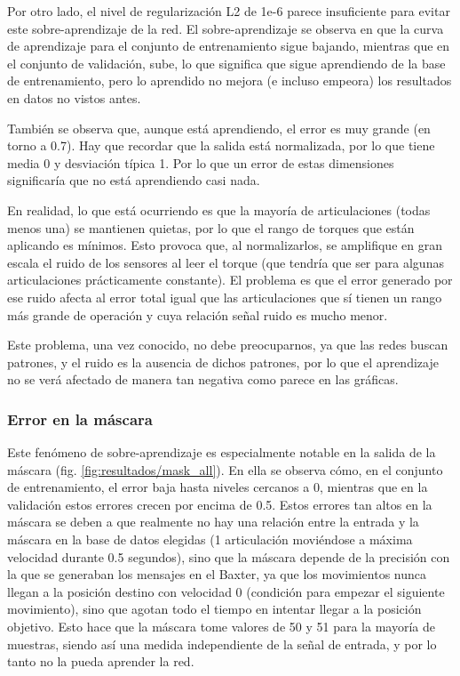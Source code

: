 Por otro lado, el nivel de regularización L2 de 1e-6 parece insuficiente para evitar este sobre-aprendizaje de la red. El sobre-aprendizaje se observa en que la curva de aprendizaje para el conjunto de entrenamiento sigue bajando, mientras que en el conjunto de validación, sube, lo que significa que sigue aprendiendo de la base de entrenamiento, pero lo aprendido no mejora (e incluso empeora) los resultados en datos no vistos antes.

También se observa que, aunque está aprendiendo, el error es muy grande (en torno a 0.7). Hay que recordar que la salida está normalizada, por lo que tiene media 0 y desviación típica 1. Por lo que un error de estas dimensiones significaría que no está aprendiendo casi nada.

En realidad, lo que está ocurriendo es que la mayoría de articulaciones (todas menos una) se mantienen quietas, por lo que el rango de torques que están aplicando es mínimos. Esto provoca que, al normalizarlos, se amplifique en gran escala el ruido de los sensores al leer el torque (que tendría que ser para algunas articulaciones prácticamente constante). El problema es que el error generado por ese ruido afecta al error total igual que las articulaciones que sí tienen un rango más grande de operación y cuya relación señal ruido es mucho menor.

Este problema, una vez conocido, no debe preocuparnos, ya que las redes buscan patrones, y el ruido es la ausencia de dichos patrones, por lo que el aprendizaje no se verá afectado de manera tan negativa como parece en las gráficas.

\subsubsection{Error en la máscara}

Este fenómeno de sobre-aprendizaje es especialmente notable en la salida de la máscara (fig. \ref{fig:resultados/mask_all}). En ella se observa cómo, en el conjunto de entrenamiento, el error baja hasta niveles cercanos a 0, mientras que en la validación estos errores crecen por encima de 0.5. Estos errores tan altos en la máscara se deben a que realmente no hay una relación entre la entrada y la máscara en la base de datos elegidas (1 articulación moviéndose a máxima velocidad durante 0.5 segundos), sino que la máscara depende de la precisión con la que se generaban los mensajes en el Baxter, ya que los movimientos nunca llegan a la posición destino con velocidad 0 (condición para empezar el siguiente movimiento), sino que agotan todo el tiempo en intentar llegar a la posición objetivo. Esto hace que la máscara tome valores de 50 y 51 para la mayoría de muestras, siendo así una medida independiente de la señal de entrada, y por lo tanto no la pueda aprender la red.

